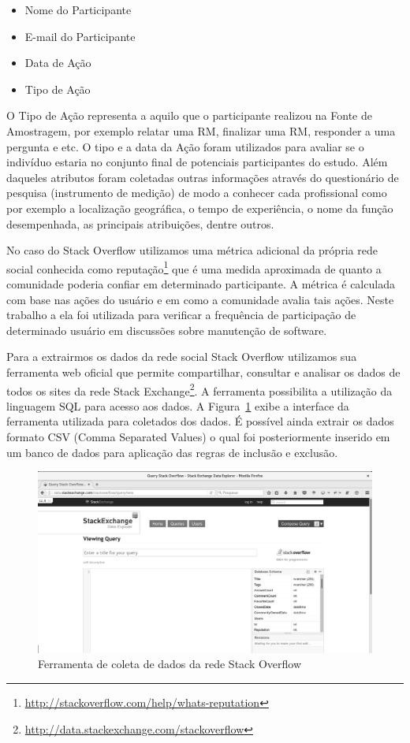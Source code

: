 \begin{itemize}
	\item Nome do Participante
	\item E-mail do Participante
	\item Data de Ação
	\item Tipo de Ação
\end{itemize}

O Tipo de Ação representa a aquilo que o participante realizou na Fonte de
Amostragem, por exemplo relatar uma RM, finalizar uma RM, responder a uma
pergunta e etc. O tipo e a data da Ação foram utilizados para avaliar se o
indivíduo estaria no conjunto final de potenciais participantes do estudo. Além
daqueles atributos foram coletadas outras informações através do questionário de
pesquisa (instrumento de medição) de modo a conhecer cada profissional como por
exemplo a localização geográfica, o tempo de experiência, o nome da função
desempenhada, as principais atribuições, dentre outros.


No caso do Stack Overflow utilizamos uma métrica adicional da própria rede
social conhecida como
reputação\footnote{\url{http://stackoverflow.com/help/whats-reputation}} que é
uma medida aproximada de quanto a comunidade poderia confiar em determinado
participante. A métrica é calculada com base nas ações do usuário e em como a
comunidade avalia tais ações. Neste trabalho a ela foi utilizada para verificar
a frequência de participação de determinado usuário em discussões sobre
manutenção de software.

Para a extrairmos os dados da rede social Stack Overflow utilizamos sua
ferramenta web oficial que permite compartilhar, consultar e analisar os dados
de todos os sites da rede Stack
Exchange\footnote{\url{http://data.stackexchange.com/stackoverflow}}. A
ferramenta possibilita a utilização da linguagem SQL para acesso aos dados. A
Figura~\ref{fig:stack-exchange} exibe a interface da ferramenta utilizada para
coletados dos dados. É possível ainda extrair os dados formato CSV (Comma
Separated Values) o qual foi posteriormente inserido em um banco de dados para
aplicação das regras de inclusão e exclusão.

\begin{figure}[htpb]
	\centering
	\includegraphics[width=0.8\linewidth]{./chapter-pesquisa-com-profissionais/img/stack-exchange.png}
	\caption{Ferramenta de coleta de dados da rede Stack Overflow}
\label{fig:stack-exchange}
\end{figure}

